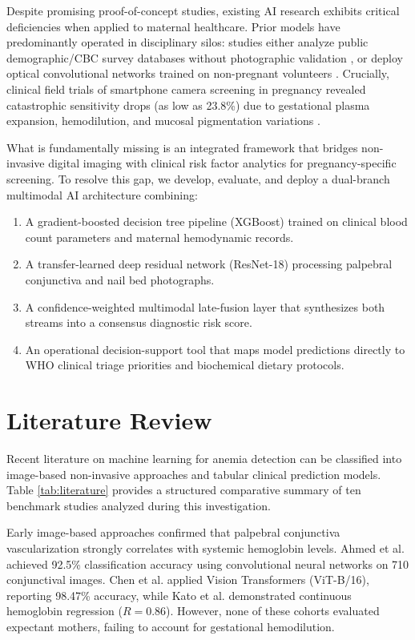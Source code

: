 \documentclass[journal,10pt,twocolumn]{IEEEtran}
\begin{document}
Despite promising proof-of-concept studies, existing AI research exhibits critical deficiencies when applied to maternal healthcare. Prior models have predominantly operated in disciplinary silos: studies either analyze public demographic/CBC survey databases without photographic validation \cite{ethiopian_dhs2024, taye2026machine}, or deploy optical convolutional networks trained on non-pregnant volunteers \cite{conjunctiva2023detection, kato2024hemoglobin}. Crucially, clinical field trials of smartphone camera screening in pregnancy revealed catastrophic sensitivity drops (as low as 23.8\%) due to gestational plasma expansion, hemodilution, and mucosal pigmentation variations \cite{niada2024cureus, wemyss2025smartphone}. 

What is fundamentally missing is an integrated framework that bridges non-invasive digital imaging with clinical risk factor analytics for pregnancy-specific screening. To resolve this gap, we develop, evaluate, and deploy a dual-branch multimodal AI architecture combining:
\begin{enumerate}
    \item A gradient-boosted decision tree pipeline (XGBoost) trained on clinical blood count parameters and maternal hemodynamic records.
    \item A transfer-learned deep residual network (ResNet-18) processing palpebral conjunctiva and nail bed photographs.
    \item A confidence-weighted multimodal late-fusion layer that synthesizes both streams into a consensus diagnostic risk score.
    \item An operational decision-support tool that maps model predictions directly to WHO clinical triage priorities and biochemical dietary protocols.
\end{enumerate}

\section{Literature Review}
Recent literature on machine learning for anemia detection can be classified into image-based non-invasive approaches and tabular clinical prediction models. Table \ref{tab:literature} provides a structured comparative summary of ten benchmark studies analyzed during this investigation.

Early image-based approaches confirmed that palpebral conjunctiva vascularization strongly correlates with systemic hemoglobin levels. Ahmed et al. \cite{conjunctiva2023detection} achieved 92.5\% classification accuracy using convolutional neural networks on 710 conjunctival images. Chen et al. \cite{vit_conjunctiva2025} applied Vision Transformers (ViT-B/16), reporting 98.47\% accuracy, while Kato et al. \cite{kato2024hemoglobin} demonstrated continuous hemoglobin regression ($R=0.86$). However, none of these cohorts evaluated expectant mothers, failing to account for gestational hemodilution.
\end{document}
